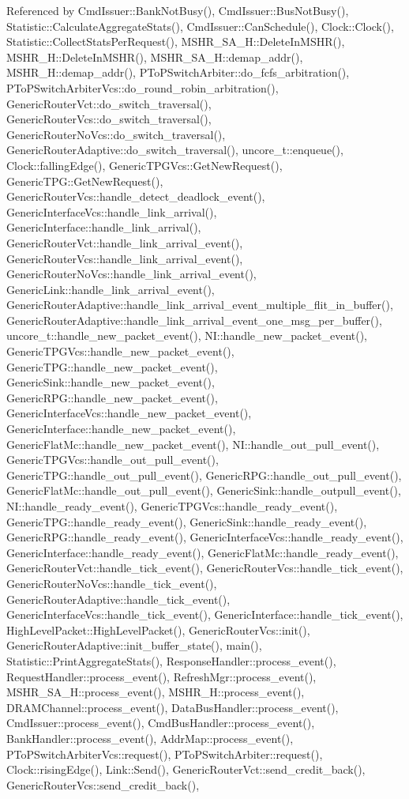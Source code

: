 Referenced by CmdIssuer::BankNotBusy(), CmdIssuer::BusNotBusy(), Statistic::CalculateAggregateStats(), CmdIssuer::CanSchedule(), Clock::Clock(), Statistic::CollectStatsPerRequest(), MSHR\_\-SA\_\-H::DeleteInMSHR(), MSHR\_\-H::DeleteInMSHR(), MSHR\_\-SA\_\-H::demap\_\-addr(), MSHR\_\-H::demap\_\-addr(), PToPSwitchArbiter::do\_\-fcfs\_\-arbitration(), PToPSwitchArbiterVcs::do\_\-round\_\-robin\_\-arbitration(), GenericRouterVct::do\_\-switch\_\-traversal(), GenericRouterVcs::do\_\-switch\_\-traversal(), GenericRouterNoVcs::do\_\-switch\_\-traversal(), GenericRouterAdaptive::do\_\-switch\_\-traversal(), uncore\_\-t::enqueue(), Clock::fallingEdge(), GenericTPGVcs::GetNewRequest(), GenericTPG::GetNewRequest(), GenericRouterVcs::handle\_\-detect\_\-deadlock\_\-event(), GenericInterfaceVcs::handle\_\-link\_\-arrival(), GenericInterface::handle\_\-link\_\-arrival(), GenericRouterVct::handle\_\-link\_\-arrival\_\-event(), GenericRouterVcs::handle\_\-link\_\-arrival\_\-event(), GenericRouterNoVcs::handle\_\-link\_\-arrival\_\-event(), GenericLink::handle\_\-link\_\-arrival\_\-event(), GenericRouterAdaptive::handle\_\-link\_\-arrival\_\-event\_\-multiple\_\-flit\_\-in\_\-buffer(), GenericRouterAdaptive::handle\_\-link\_\-arrival\_\-event\_\-one\_\-msg\_\-per\_\-buffer(), uncore\_\-t::handle\_\-new\_\-packet\_\-event(), NI::handle\_\-new\_\-packet\_\-event(), GenericTPGVcs::handle\_\-new\_\-packet\_\-event(), GenericTPG::handle\_\-new\_\-packet\_\-event(), GenericSink::handle\_\-new\_\-packet\_\-event(), GenericRPG::handle\_\-new\_\-packet\_\-event(), GenericInterfaceVcs::handle\_\-new\_\-packet\_\-event(), GenericInterface::handle\_\-new\_\-packet\_\-event(), GenericFlatMc::handle\_\-new\_\-packet\_\-event(), NI::handle\_\-out\_\-pull\_\-event(), GenericTPGVcs::handle\_\-out\_\-pull\_\-event(), GenericTPG::handle\_\-out\_\-pull\_\-event(), GenericRPG::handle\_\-out\_\-pull\_\-event(), GenericFlatMc::handle\_\-out\_\-pull\_\-event(), GenericSink::handle\_\-outpull\_\-event(), NI::handle\_\-ready\_\-event(), GenericTPGVcs::handle\_\-ready\_\-event(), GenericTPG::handle\_\-ready\_\-event(), GenericSink::handle\_\-ready\_\-event(), GenericRPG::handle\_\-ready\_\-event(), GenericInterfaceVcs::handle\_\-ready\_\-event(), GenericInterface::handle\_\-ready\_\-event(), GenericFlatMc::handle\_\-ready\_\-event(), GenericRouterVct::handle\_\-tick\_\-event(), GenericRouterVcs::handle\_\-tick\_\-event(), GenericRouterNoVcs::handle\_\-tick\_\-event(), GenericRouterAdaptive::handle\_\-tick\_\-event(), GenericInterfaceVcs::handle\_\-tick\_\-event(), GenericInterface::handle\_\-tick\_\-event(), HighLevelPacket::HighLevelPacket(), GenericRouterVcs::init(), GenericRouterAdaptive::init\_\-buffer\_\-state(), main(), Statistic::PrintAggregateStats(), ResponseHandler::process\_\-event(), RequestHandler::process\_\-event(), RefreshMgr::process\_\-event(), MSHR\_\-SA\_\-H::process\_\-event(), MSHR\_\-H::process\_\-event(), DRAMChannel::process\_\-event(), DataBusHandler::process\_\-event(), CmdIssuer::process\_\-event(), CmdBusHandler::process\_\-event(), BankHandler::process\_\-event(), AddrMap::process\_\-event(), PToPSwitchArbiterVcs::request(), PToPSwitchArbiter::request(), Clock::risingEdge(), Link::Send(), GenericRouterVct::send\_\-credit\_\-back(), GenericRouterVcs::send\_\-credit\_\-back(), 